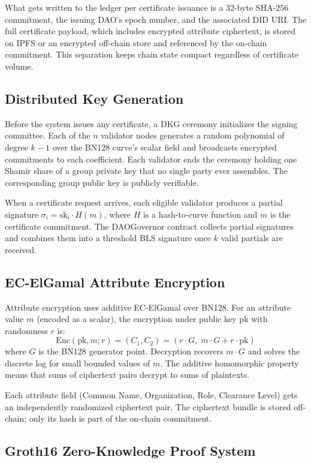 \documentclass[12pt,a4paper]{article}
\begin{document}
What gets written to the ledger per certificate issuance is a 32-byte SHA-256 commitment, the issuing DAO's epoch number, and the associated DID URI. The full certificate payload, which includes encrypted attribute ciphertext, is stored on IPFS or an encrypted off-chain store and referenced by the on-chain commitment. This separation keeps chain state compact regardless of certificate volume.

\subsection{Distributed Key Generation}

Before the system issues any certificate, a DKG ceremony initializes the signing committee. Each of the $n$ validator nodes generates a random polynomial of degree $k-1$ over the BN128 curve's scalar field and broadcasts encrypted commitments to each coefficient. Each validator ends the ceremony holding one Shamir share of a group private key that no single party ever assembles. The corresponding group public key is publicly verifiable.

When a certificate request arrives, each eligible validator produces a partial signature $\sigma_i = \text{sk}_i \cdot H(m)$, where $H$ is a hash-to-curve function and $m$ is the certificate commitment. The DAOGovernor contract collects partial signatures and combines them into a threshold BLS signature once $k$ valid partials are received.

\subsection{EC-ElGamal Attribute Encryption}

Attribute encryption uses additive EC-ElGamal over BN128. For an attribute value $m$ (encoded as a scalar), the encryption under public key $\text{pk}$ with randomness $r$ is:
\[
  \text{Enc}(\text{pk}, m; r) = (C_1, C_2) = (r \cdot G,\; m \cdot G + r \cdot \text{pk})
\]
where $G$ is the BN128 generator point. Decryption recovers $m \cdot G$ and solves the discrete log for small bounded values of $m$. The additive homomorphic property means that sums of ciphertext pairs decrypt to sums of plaintexts.

Each attribute field (Common Name, Organization, Role, Clearance Level) gets an independently randomized ciphertext pair. The ciphertext bundle is stored off-chain; only its hash is part of the on-chain commitment.

\subsection{Groth16 Zero-Knowledge Proof System}
\end{document}
